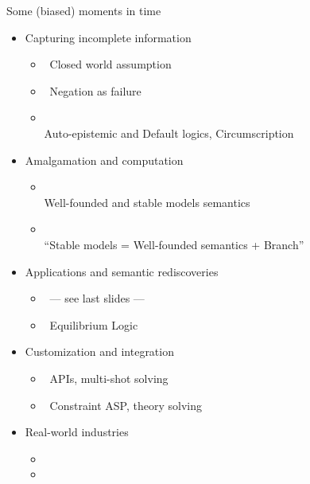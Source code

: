\begin{frame}{Some (biased) moments in time}
  \bigskip
  \begin{itemize}
  \item<1-7> Capturing incomplete information
    \begin{itemize}
    \item<only@2>  \ Closed world assumption
    \item<only@2>  \ Negation as failure
    \item<only@2> \\ Auto-epistemic and Default logics, Circumscription
    \end{itemize}
    \smallskip
  \item<1-7> Amalgamation and computation
    \begin{itemize}
    \item<only@3> \\ Well-founded and stable models semantics
    \item<only@3> \\ ``Stable models = Well-founded semantics + Branch''
    \end{itemize}
    \smallskip
  \item<1-7> Applications and semantic rediscoveries
    \begin{itemize}
    \item<only@4>  \ --- see last slides ---
    \item<only@4>    \ Equilibrium Logic
    \end{itemize}
    \smallskip
  \item<1-7> Customization and integration
    \begin{itemize}
    \item <only@5>  \ APIs, multi-shot solving
    \item <only@5>  \ Constraint ASP, theory solving
    \end{itemize}
    \smallskip
  \item <only@7>  Real-world industries
    \begin{itemize}
    \item <only@7> 
    \item <only@7> 
    \end{itemize}
  \end{itemize}
\end{frame}
%
